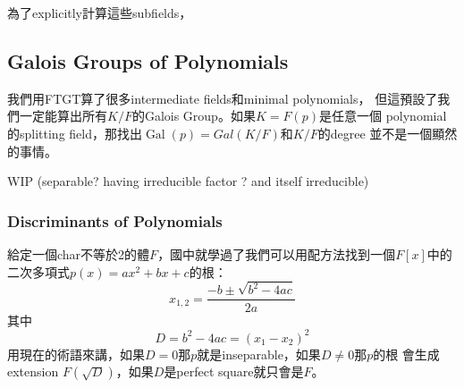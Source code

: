 \documentclass[12pt]{article}
\theoremstyle{definition}
\newtheorem{prop}{Proposition}
\DeclareMathOperator{\Gal}{Gal}
\begin{document}
為了explicitly計算這些subfields，


\subsection{Galois Groups of Polynomials}

我們用FTGT算了很多intermediate fields和minimal polynomials，
但這預設了我們一定能算出所有$K/F$的Galois Group。如果$K=F(p)$是任意一個
polynomial的splitting field，那找出$\Gal(p)=Gal(K/F)$和$K/F$的degree
並不是一個顯然的事情。

WIP (separable? having irreducible factor ? and itself irreducible)









\subsubsection{Discriminants of Polynomials}

給定一個char不等於2的體$F$，國中就學過了我們可以用配方法找到一個$F[x]$中的二次多項式$p(x)=ax^2+bx+c$的根：
\[
	x_{1,2}=\frac{-b\pm\sqrt{b^2-4ac}}{2a}
\]
其中
\[
	D=b^2-4ac=(x_1-x_2)^2
\]
用現在的術語來講，如果$D=0$那$p$就是inseparable，如果$D\neq 0$那$p$的根
會生成extension $F(\sqrt{D})$，如果$D$是perfect square就只會是$F$。
\end{document}
